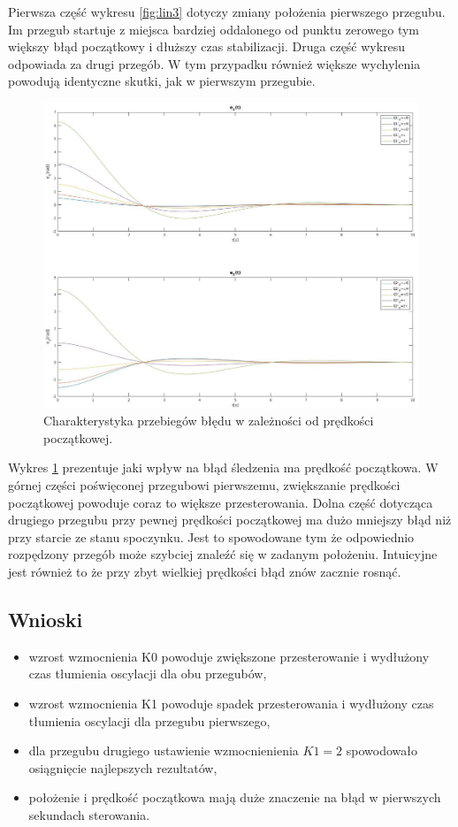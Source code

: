 \documentclass[12pt,a4paper]{article}
\begin{document}
    Pierwsza część wykresu \ref{fig:lin3} dotyczy zmiany położenia pierwszego przegubu. Im przegub startuje z miejsca bardziej oddalonego od punktu zerowego tym większy błąd początkowy i dłuższy czas stabilizacji. Druga część wykresu odpowiada za drugi przegób. W tym przypadku również większe wychylenia powodują identyczne skutki, jak w pierwszym przegubie.

  \begin{figure}[H]
    \centering
    \includegraphics[width=1\textwidth]{figures/lin4.jpg}
    \caption{Charakterystyka przebiegów błędu w zależności od prędkości początkowej.}
    \label{fig:lin4}
  \end{figure}

    Wykres \ref{fig:lin4} prezentuje jaki wpływ na błąd śledzenia ma prędkość początkowa. W górnej części poświęconej przegubowi pierwszemu, zwiększanie prędkości początkowej powoduje coraz to większe przesterowania. Dolna część dotycząca drugiego przegubu przy pewnej prędkości początkowej ma dużo mniejszy błąd niż przy starcie ze stanu spoczynku. Jest to spowodowane tym że odpowiednio rozpędzony przegób może szybciej znaleźć się w zadanym położeniu. Intuicyjne jest również to że przy zbyt wielkiej prędkości błąd znów zacznie rosnąć. 

  \subsection{Wnioski}

  \begin{itemize}
    \item wzrost wzmocnienia K0 powoduje zwiększone przesterowanie i wydłużony czas tłumienia oscylacji dla obu przegubów,
    \item wzrost wzmocnienia K1 powoduje spadek przesterowania i wydłużony czas tłumienia oscylacji dla przegubu pierwszego,
    \item dla przegubu drugiego ustawienie wzmocnienienia $K1=2$ spowodowało osiągnięcie najlepszych rezultatów,
    \item położenie i prędkość początkowa mają duże znaczenie na błąd w pierwszych sekundach sterowania. 
  \end{itemize}
  
\end{document}
